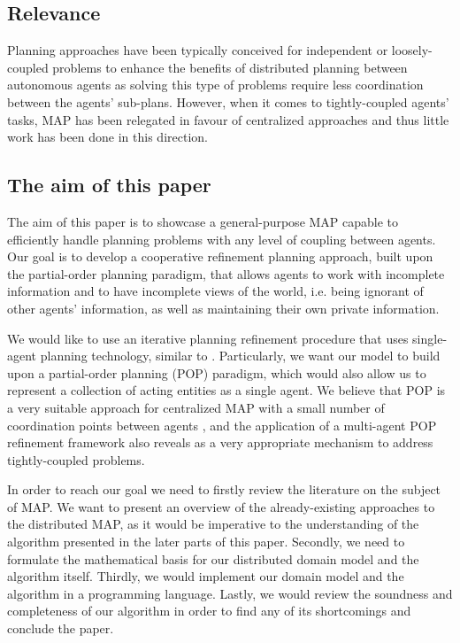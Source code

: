 \documentclass[12pt]{article}
\begin{document}
\subsection{Relevance}

Planning approaches have been typically conceived for independent or loosely-coupled problems to enhance the benefits of distributed planning between autonomous agents as solving this type of problems require less coordination between the agents' sub-plans.
However, when it comes to tightly-coupled agents' tasks, MAP has been relegated in favour of centralized approaches and thus little work has been done in this direction.

\subsection{The aim of this paper}

The aim of this paper is to showcase a general-purpose MAP capable to efficiently handle planning problems with any level of coupling between agents.
Our goal is to develop a cooperative refinement planning approach, built upon the partial-order planning paradigm, that allows agents to work with incomplete information and to have incomplete views of the world, i.e.
being ignorant of other agents' information, as well as maintaining their own private information.

We would like to use an iterative planning refinement procedure that uses single-agent planning technology, similar to \cite{Jonsson2011ScalingUM}.
Particularly, we want our model to build upon a partial-order planning (POP) paradigm, which would also allow us to represent a collection of acting entities as a single agent.
We believe that POP is a very suitable approach for centralized MAP with a small number of coordination points between agents \cite{Kvarnstrm2010PlanningFL}, and the application of a multi-agent POP refinement framework also reveals as a very appropriate mechanism to address tightly-coupled problems.

In order to reach our goal we need to firstly review the literature on the subject of MAP. We want to present an overview of the already-existing approaches to the distributed MAP, as it would be imperative to the understanding of the algorithm presented in the later parts of this paper.
Secondly, we need to formulate the mathematical basis for our distributed domain model and the algorithm itself.
Thirdly, we would implement our domain model and the algorithm in a programming language.
Lastly, we would review the soundness and completeness of our algorithm in order to find any of its shortcomings and conclude the paper.
\end{document}
